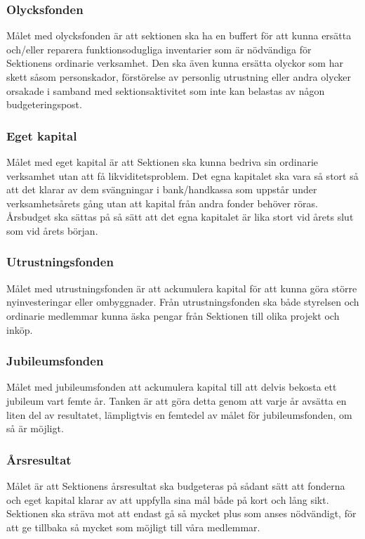 \documentclass[../_main/handlingar.tex]{subfiles}
\begin{document}
    \subsubsection*{Olycksfonden}
    Målet med olycksfonden är att sektionen ska ha en buffert för att kunna ersätta och/eller reparera funktionsodugliga inventarier som är nödvändiga för Sektionens ordinarie verksamhet. Den ska även kunna ersätta olyckor som har skett såsom personskador, förstörelse av personlig utrustning eller andra olycker orsakade i samband med sektionsaktivitet som inte kan belastas av någon budgeteringspost.
    
    \subsubsection*{Eget kapital}
    Målet med eget kapital är att Sektionen ska kunna bedriva sin ordinarie verksamhet utan att få likviditetsproblem. Det egna kapitalet ska vara så stort så att det klarar av dem svängningar i bank/handkassa som uppstår under verksamhetsårets gång utan att kapital från andra fonder behöver röras. Årsbudget ska sättas på så sätt att det egna kapitalet är lika stort vid årets slut som vid årets början.
    
    \subsubsection*{Utrustningsfonden}
    Målet med utrustningsfonden är att ackumulera kapital för att kunna göra större nyinvesteringar eller ombyggnader. Från utrustningsfonden ska både styrelsen och ordinarie medlemmar kunna äska pengar från Sektionen till olika projekt och inköp. 

    \subsubsection*{Jubileumsfonden}
    Målet med jubileumsfonden att ackumulera kapital till att delvis bekosta ett jubileum vart femte år. Tanken är att göra detta genom att varje år avsätta en liten del av resultatet, lämpligtvis en femtedel av målet för jubileumsfonden, om så är möjligt. 

    \subsubsection*{Årsresultat}
    Målet är att Sektionens årsresultat ska budgeteras på sådant sätt att fonderna och eget kapital klarar av att uppfylla sina mål både på kort och lång sikt. Sektionen ska sträva mot att endast gå så mycket plus som anses nödvändigt, för att ge tillbaka så mycket som möjligt till våra medlemmar.
    
\end{document}
